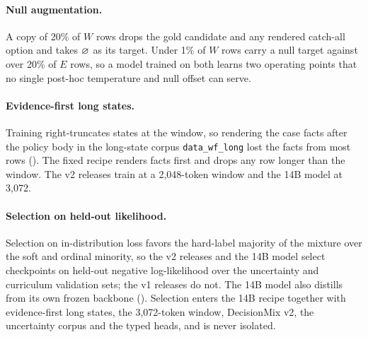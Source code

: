 \paragraph{Null augmentation.}
\label{sec:train:nullaug}
A copy of 20\% of $W$ rows drops the gold candidate and any rendered catch-all option and takes $\varnothing$
as its target. Under 1\% of $W$ rows carry a null target against over 20\% of $E$ rows, so a model trained
on both learns two operating points that no single post-hoc temperature and null offset can serve.

\paragraph{Evidence-first long states.}
\label{sec:train:long}
Training right-truncates states at the window, so rendering the case facts after the policy body in the
long-state corpus \texttt{data\_wf\_long} lost the facts from most rows (). The
fixed recipe renders facts first and drops any row longer than the window. The v2 releases train at a
2{,}048-token window and the 14B model at 3{,}072.

\paragraph{Selection on held-out likelihood.}
\label{sec:train:selection}
Selection on in-distribution loss favors the hard-label majority of the mixture over the soft and ordinal
minority, so the v2 releases and the 14B model select checkpoints on held-out negative log-likelihood over
the uncertainty and curriculum validation sets; the v1 releases do not. The 14B model also distills from
its own frozen backbone (). Selection enters the 14B recipe together with
evidence-first long states, the 3{,}072-token window, DecisionMix v2, the uncertainty corpus and the typed
heads, and is never isolated.
